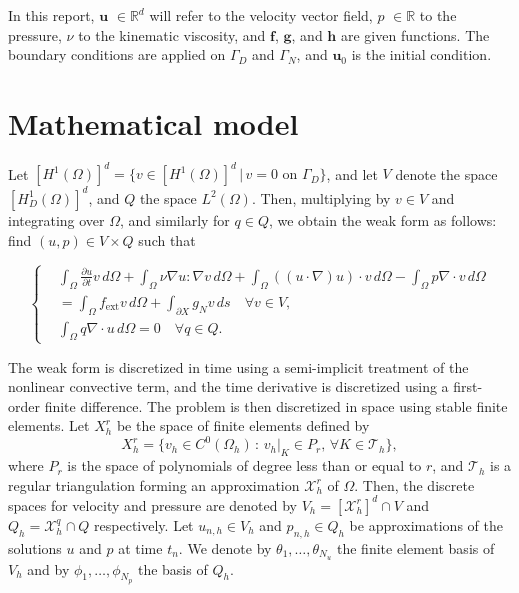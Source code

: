 \documentclass{article}
\begin{document}
In this report, \(\mathbf{u}\) $\in \mathbb{R}^d$ will refer to the velocity vector field, \(p\) $\in \mathbb{R}$ to the pressure, \(\nu\) to the kinematic viscosity, and \(\mathbf{f}\), \(\mathbf{g}\), and \(\mathbf{h}\) are given functions. The boundary conditions are applied on \(\Gamma_D\) and \(\Gamma_N\), and \(\mathbf{u}_0\) is the initial condition.


\section{Mathematical model}
Let \( [H^1(\Omega)]^d = \{ v \in [H^1(\Omega)]^d \,|\, v = 0 \text{ on } \Gamma_D \} \), and let \( V \) denote the space \( [H^1_D(\Omega)]^d \), and \( Q \) the space \( L^2(\Omega) \). Then, multiplying by \( v \in V \) and integrating over \( \Omega \), and similarly for \( q \in Q \), we obtain the weak form as follows: find \( (u, p) \in V \times Q \) such that

\begin{equation}
\left\{
\begin{aligned}
    &\int_\Omega \frac{\partial u}{\partial t} v \,d\Omega + \int_\Omega \nu \nabla u : \nabla v \,d\Omega + \int_\Omega \left((u \cdot \nabla)u \right) \cdot v \,d\Omega - \int_\Omega p \nabla \cdot v \,d\Omega \\
    &= \int_\Omega f_{\text{ext}} v \,d\Omega + \int_{\partial X} g_N v \,ds \quad \forall v \in V, \\
    &\int_\Omega q \nabla \cdot u \,d\Omega = 0 \quad \forall q \in Q.
\end{aligned}
\right.
\label{eq:weak_formulation}
\end{equation}


The weak form is discretized in time using a semi-implicit treatment of the nonlinear convective term, and the time derivative is discretized using a first-order finite difference. The problem is then discretized in space using stable finite elements. Let $X_h^r$ be the space of finite elements defined by
\[
X_h^r = \{ v_h \in C^0(\Omega_h) \,: \,v_h|_K \in P_r, \, \forall K \in \mathcal{T}_h \},
\]
where \(P_r\) is the space of polynomials of degree less than or equal to \(r\), and \(\mathcal{T}_h\) is a regular triangulation forming an approximation \(\mathcal{X}_h^r\) of \(\Omega\). Then, the discrete spaces for velocity and pressure are denoted by \(V_h = [\mathcal{X}_h^r]^d \cap V\) and \(Q_h = \mathcal{X}_h^q \cap Q\) respectively. Let \(u_{n,h} \in V_h\) and \(p_{n,h} \in Q_h\) be approximations of the solutions \(u\) and \(p\) at time \(t_n\). We denote by \(\theta_1, \ldots, \theta_{N_u}\) the finite element basis of \(V_h\) and by \(\phi_1, \ldots, \phi_{N_p}\) the basis of \(Q_h\).
\end{document}
